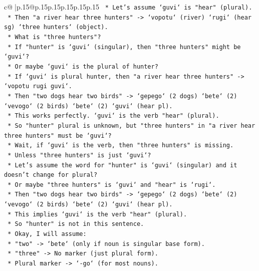 \documentclass{article}
\begin{document}
{\begin{supertabular}{c@{$\;$}|p{.15\linewidth}@{}p{.15\linewidth}p{.15\linewidth}p{.15\linewidth}p{.15\linewidth}p{.15\linewidth}}
{{{\texttt{                *   Let's assume `guvi` is "hear" (plural).} \\
\texttt{                *   Then "a river hear three hunters" {-}> `vopotu` (river) `rugi` (hear sg) `three hunters` (object).} \\
\texttt{                *   What is "three hunters"?} \\
\texttt{                *   If "hunter" is `guvi` (singular), then "three hunters" might be `guvi`?} \\
\texttt{                *   Or maybe `guvi` is the plural of hunter?} \\
\texttt{                *   If `guvi` is plural hunter, then "a river hear three hunters" {-}> `vopotu rugi guvi`.} \\
\texttt{                *   Then "two dogs hear two birds" {-}> `gepego` (2 dogs) `bete` (2) `vevogo` (2 birds) `bete` (2) `guvi` (hear pl).} \\
\texttt{                *   This works perfectly. `guvi` is the verb "hear" (plural).} \\
\texttt{                *   So "hunter" plural is unknown, but "three hunters" in "a river hear three hunters" must be `guvi`?} \\
\texttt{                *   Wait, if `guvi` is the verb, then "three hunters" is missing.} \\
\texttt{                *   Unless "three hunters" is just `guvi`?} \\
\texttt{                *   Let's assume the word for "hunter" is `guvi` (singular) and it doesn't change for plural?} \\
\texttt{                *   Or maybe "three hunters" is `guvi` and "hear" is `rugi`.} \\
\texttt{                *   Then "two dogs hear two birds" {-}> `gepego` (2 dogs) `bete` (2) `vevogo` (2 birds) `bete` (2) `guvi` (hear pl).} \\
\texttt{                *   This implies `guvi` is the verb "hear" (plural).} \\
\texttt{                *   So "hunter" is not in this sentence.} \\
\texttt{                *   Okay, I will assume:} \\
\texttt{                    *   "two" {-}> `bete` (only if noun is singular base form).} \\
\texttt{                    *   "three" {-}> No marker (just plural form).} \\
\texttt{                    *   Plural marker {-}> `{-}go` (for most nouns).} \\
}}}
\end{supertabular}}
\end{document}
